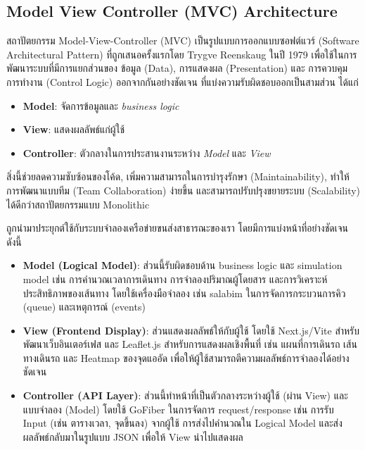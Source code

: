 \subsection{Model View Controller (MVC) Architecture}

สถาปัตยกรรม Model-View-Controller (MVC) เป็นรูปแบบการออกแบบซอฟต์แวร์ (Software Architectural Pattern) 
ที่ถูกเสนอครั้งแรกโดย Trygve Reenskaug ในปี 1979 เพื่อใช้ในการพัฒนาระบบที่มีการแยกส่วนของ 
ข้อมูล (Data), การแสดงผล (Presentation) และ การควบคุมการทำงาน (Control Logic) ออกจากกันอย่างชัดเจน
ที่แบ่งความรับผิดชอบออกเป็นสามส่วน ได้แก่ 

\begin{itemize}
  \item \textbf{Model}: จัดการข้อมูลและ \textit{business logic}
  \item \textbf{View}: แสดงผลลัพธ์แก่ผู้ใช้
  \item \textbf{Controller}: ตัวกลางในการประสานงานระหว่าง \textit{Model} และ \textit{View}
\end{itemize}

สิ่งนี้ช่วยลดความซับซ้อนของโค้ด, เพิ่มความสามารถในการบำรุงรักษา (Maintainability), 
ทำให้การพัฒนาแบบทีม (Team Collaboration) ง่ายขึ้น และสามารถปรับปรุงขยายระบบ (Scalability) 
ได้ดีกว่าสถาปัตยกรรมแบบ Monolithic

ถูกนำมาประยุกต์ใช้กับระบบจำลองเครือข่ายขนส่งสาธารณะของเรา โดยมีการแบ่งหน้าที่อย่างชัดเจน ดังนี้
\begin{itemize}
  \item \textbf{Model (Logical Model)}: 
  ส่วนนี้รับผิดชอบด้าน business logic และ simulation model
  เช่น การคำนวณเวลาการเดินทาง การจำลองปริมาณผู้โดยสาร 
  และการวิเคราะห์ประสิทธิภาพของเส้นทาง โดยใช้เครื่องมือจำลอง 
  เช่น salabim ในการจัดการกระบวนการคิว (queue) และเหตุการณ์ (events) 

  \item \textbf{View (Frontend Display)}: 
  ส่วนแสดงผลลัพธ์ให้กับผู้ใช้ โดยใช้ Next.js/Vite
  สำหรับพัฒนาเว็บอินเตอร์เฟส และ Leaflet.js สำหรับการแสดงผลเชิงพื้นที่ 
  เช่น แผนที่การเดินรถ เส้นทางเดินรถ และ Heatmap ของจุดแออัด 
  เพื่อให้ผู้ใช้สามารถตีความผลลัพธ์การจำลองได้อย่างชัดเจน

  \item \textbf{Controller (API Layer)}: 
  ส่วนนี้ทำหน้าที่เป็นตัวกลางระหว่างผู้ใช้ (ผ่าน View) และแบบจำลอง (Model) 
  โดยใช้ GoFiber ในการจัดการ request/response
  เช่น การรับ Input (เช่น ตารางเวลา, จุดขึ้นลง) จากผู้ใช้ 
  การส่งไปคำนวณใน Logical Model และส่งผลลัพธ์กลับมาในรูปแบบ JSON
  เพื่อให้ View นำไปแสดงผล
\end{itemize}

